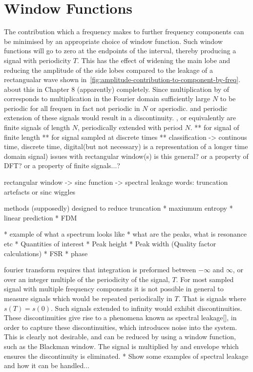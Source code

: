 \section{Window Functions}
The contribution which a frequency makes to further frequency components can be
minimised by an appropriate choice of window function. Such window functions
will go to zero at the endpoints of the interval, thereby producing a signal
with periodicity $T$. This has the effect of widening the main lobe and reducing
the amplitude of the side lobes compared to the leakage of a rectangualar wave
shown in~\ref{fig:amplitude-contribution-to-component-by-freq}. %
about this in Chapter 8 (apparently) %
completely. %
Since multiplication by of corresponds to multiplication in the Fourier domain
sufficiently large $N$ to be periodic for all frequen in fact not periodic in
$N$ or aperiodic. and periodic extension of these signals would result in a
discontinuity. , or equivalently are finite signals of length $N$, periodically
extended with period $N$. ** for signal of finite length ** for signal sampled
at discrete times ** classification -> continous time, discrete time,
digital(but not necessary) %
is a representation of a longer time domain signal) issues with rectangular
window(s) is this general? or a property of DFT? or a property of finite
signals...?

rectangular window -> sinc function -> spectral leakage words: truncation
artefacts or sinc wiggles

methods (supposedly) designed to reduce truncation * maxiumum entropy * linear
prediction * FDM %


* example of what a spectrum looks like * what are the peaks, what is resonance
etc * Quantities of interest * Peak height * Peak width (Quality factor
calculations) * FSR * phase

fourier transform requires that integration is preformed between $-\infty$ and
$\infty$, or over an integer multiple of the periodicity of the signal, $T$. For
most sampled signal with multiple frequency components it is not possible in
general to measure signals which would be repeated periodically in $T$. That is
signals where $s(T) = s(0)$. Such signals extended to infinity would exhibit
discontinuities. These discontinuities give rise to a phenomena known as
spectral leakage[], in order to capture these discontinuities, which introduces
noise into the system. This is clearly not desirable, and can be reduced by
using a window function, such as the Blackman window. The signal is multiplied
by and envelope which ensures the discontinuity is eliminated. * Show some
examples of spectral leakage and how it can be handled...
